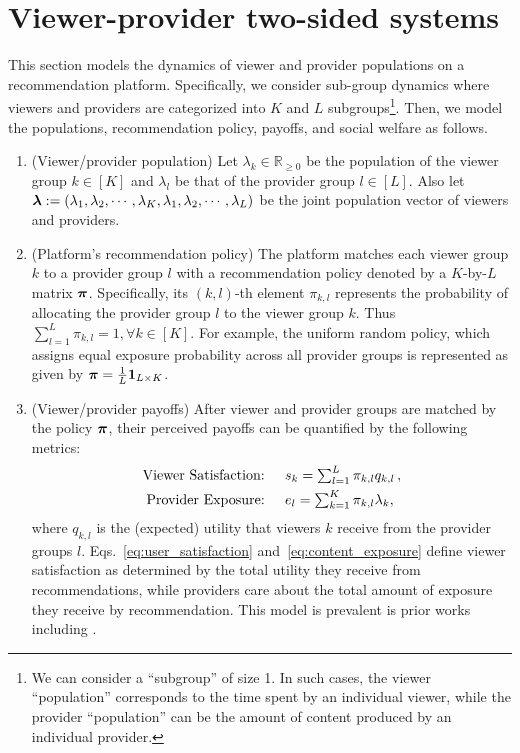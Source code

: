 \section{Viewer-provider two-sided systems}

This section models the dynamics of viewer and provider populations on a recommendation platform. 
Specifically, we consider sub-group dynamics where viewers and providers are categorized into $K$ and $L$ subgroups\footnote{We can consider a ``subgroup'' of size 1. In such cases, the viewer ``population'' corresponds to the time spent by an individual viewer, while the provider ``population'' can be the amount of content produced by an individual provider.
}. Then, we model the populations, recommendation policy, payoffs, and social welfare as follows.

\begin{enumerate}[leftmargin=12pt]
    \item (Viewer/provider population)  
    Let $\lambda_{k} \in \mathbb{R}_{\geq 0}$ be the population of the viewer group $k \in [K]$ and $\lambda_{l}$ be that of the provider group $l \in [L]$. Also let $\bm{\lambda} := (\lambda_{1}, \lambda_{2}, \cdots, \lambda_{K},
    \lambda_{1}, \lambda_{2}, \cdots, \lambda_{L})$ be the joint population vector of viewers and providers.
    \item (Platform's recommendation policy) 
    The platform matches each viewer group $k$ to a provider group $l$ with a recommendation policy denoted by a $K$-by-$L$ matrix $\bm{\pi}$. Specifically, its $(k,l)$-th element $\pi_{k,l}$ represents the probability of allocating the provider group $l$ to the viewer group $k$. 
    Thus $\sum_{l=1}^L \pi_{k,l} = 1, \forall k \in [K]$. For example, the uniform random policy, which assigns equal exposure probability across all provider groups is represented as given by $\bm{\pi}=\frac{1}{L}\bm{1}_{L\times K}$.
    \item (Viewer/provider payoffs) After viewer and provider groups are matched by the policy $\bm{\pi}$, their perceived payoffs can be quantified by the following metrics:
    \begin{align}\label{eq:user_satisfaction}
    \text{Viewer Satisfaction: \quad } & s_k = \textstyle \sum_{l=1}^L \pi_{k,l} q_{k,l} \,  , \\\label{eq:content_exposure}
    \text{Provider Exposure: \quad} & e_l = \textstyle\sum_{k=1}^K \pi_{k,l}\lambda_k,
    \end{align}
    where $q_{k,l}$ is the (expected) utility that viewers $k$ receive from the provider groups $l$. Eqs.~\eqref{eq:user_satisfaction} and~\eqref{eq:content_exposure} define viewer satisfaction as determined by the total utility they receive from recommendations, while providers care about the total amount of exposure they receive by recommendation. This model is prevalent is prior works including \citep{singh2018fairness, mladenov2020optimizing}.

\end{enumerate}
